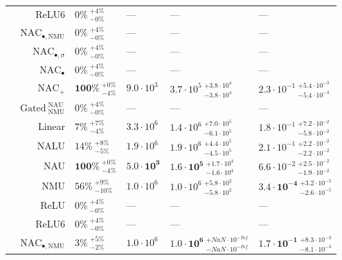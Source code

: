 \begin{longtable}{crllll}
\nopagebreak
\multirow{-11}{*}{\centering\arraybackslash $\bm{+}$} & ReLU6 & $0\% {~}^{+4\%}_{-0\%}$ & --- & --- & ---\\
\cmidrule{1-6}
 & $\mathrm{NAC}_{\bullet,\mathrm{NMU}}$ & $0\% {~}^{+4\%}_{-0\%}$ & --- & --- & ---\\

\nopagebreak
 & $\mathrm{NAC}_{\bullet,\sigma}$ & $0\% {~}^{+4\%}_{-0\%}$ & --- & --- & ---\\

\nopagebreak
 & $\mathrm{NAC}_{\bullet}$ & $0\% {~}^{+4\%}_{-0\%}$ & --- & --- & ---\\

\nopagebreak
 & $\mathrm{NAC}_{+}$ & $\mathbf{100\%} {~}^{+0\%}_{-4\%}$ & $9.0 \cdot 10^{3}$ & $3.7 \cdot 10^{5} {~}^{+3.8 \cdot 10^{4}}_{-3.8 \cdot 10^{4}}$ & $2.3 \cdot 10^{-1} {~}^{+5.4 \cdot 10^{-3}}_{-5.4 \cdot 10^{-3}}$\\

\nopagebreak
 & $\mathrm{Gated~}^{\mathrm{NAU}}_{\mathrm{NMU}}$ & $0\% {~}^{+4\%}_{-0\%}$ & --- & --- & ---\\

\nopagebreak
 & Linear & $7\% {~}^{+7\%}_{-4\%}$ & $3.3 \cdot 10^{6}$ & $1.4 \cdot 10^{6} {~}^{+7.0 \cdot 10^{5}}_{-6.1 \cdot 10^{5}}$ & $1.8 \cdot 10^{-1} {~}^{+7.2 \cdot 10^{-2}}_{-5.8 \cdot 10^{-2}}$\\

\nopagebreak
 & NALU & $14\% {~}^{+8\%}_{-5\%}$ & $1.9 \cdot 10^{6}$ & $1.9 \cdot 10^{6} {~}^{+4.4 \cdot 10^{5}}_{-4.5 \cdot 10^{5}}$ & $2.1 \cdot 10^{-1} {~}^{+2.2 \cdot 10^{-2}}_{-2.2 \cdot 10^{-2}}$\\

\nopagebreak
 & NAU & $\mathbf{100\%} {~}^{+0\%}_{-4\%}$ & $\mathbf{5.0 \cdot 10^{3}}$ & $\mathbf{1.6 \cdot 10^{5}} {~}^{+1.7 \cdot 10^{4}}_{-1.6 \cdot 10^{4}}$ & $6.6 \cdot 10^{-2} {~}^{+2.5 \cdot 10^{-2}}_{-1.9 \cdot 10^{-2}}$\\

\nopagebreak
 & NMU & $56\% {~}^{+9\%}_{-10\%}$ & $1.0 \cdot 10^{6}$ & $1.0 \cdot 10^{6} {~}^{+5.8 \cdot 10^{2}}_{-5.8 \cdot 10^{2}}$ & $\mathbf{3.4 \cdot 10^{-4}} {~}^{+3.2 \cdot 10^{-5}}_{-2.6 \cdot 10^{-5}}$\\

\nopagebreak
 & ReLU & $0\% {~}^{+4\%}_{-0\%}$ & --- & --- & ---\\

\nopagebreak
\multirow{-11}{*}{\centering\arraybackslash $\bm{-}$} & ReLU6 & $0\% {~}^{+4\%}_{-0\%}$ & --- & --- & ---\\
\cmidrule{1-6}
 & $\mathrm{NAC}_{\bullet,\mathrm{NMU}}$ & $3\% {~}^{+5\%}_{-2\%}$ & $1.0 \cdot 10^{6}$ & $\mathbf{1.0 \cdot 10^{6}} {~}^{+NaN \cdot 10^{-Inf}}_{-NaN \cdot 10^{-Inf}}$ & $\mathbf{1.7 \cdot 10^{-1}} {~}^{+8.3 \cdot 10^{-3}}_{-8.1 \cdot 10^{-3}}$\\


\end{longtable}
